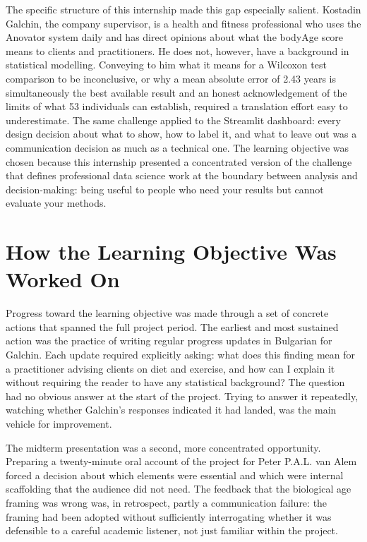 \documentclass[11pt,a4paper]{report}
\begin{document}
The specific structure of this internship made this gap especially salient. Kostadin Galchin, the
company supervisor, is a health and fitness professional who uses the Anovator system daily and has
direct opinions about what the bodyAge score means to clients and practitioners. He does not,
however, have a background in statistical modelling. Conveying to him what it means for a Wilcoxon
test comparison to be inconclusive, or why a mean absolute error of 2.43 years is simultaneously
the best available result and an honest acknowledgement of the limits of what 53 individuals can
establish, required a translation effort easy to underestimate. The same challenge applied to the
Streamlit dashboard: every design decision about what to show, how to label it, and what to leave
out was a communication decision as much as a technical one. The learning objective was chosen
because this internship presented a concentrated version of the challenge that defines professional
data science work at the boundary between analysis and decision-making: being useful to people who
need your results but cannot evaluate your methods.

\section{How the Learning Objective Was Worked On}

Progress toward the learning objective was made through a set of concrete actions that spanned the
full project period. The earliest and most sustained action was the practice of writing regular
progress updates in Bulgarian for Galchin. Each update required explicitly asking: what does this
finding mean for a practitioner advising clients on diet and exercise, and how can I explain it
without requiring the reader to have any statistical background? The question had no obvious answer
at the start of the project. Trying to answer it repeatedly, watching whether Galchin's responses
indicated it had landed, was the main vehicle for improvement.

The midterm presentation was a second, more concentrated opportunity. Preparing a twenty-minute
oral account of the project for Peter P.A.L. van Alem forced a decision about which elements were essential
and which were internal scaffolding that the audience did not need. The feedback that the biological
age framing was wrong was, in retrospect, partly a communication failure: the framing had been
adopted without sufficiently interrogating whether it was defensible to a careful academic listener,
not just familiar within the project.
\end{document}
